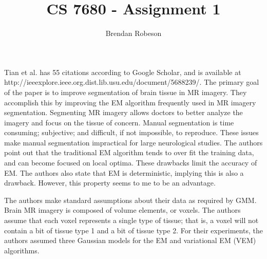 \documentclass[11pt]{article}
\begin{document}
\title{CS 7680 - Assignment 1}
\author{Brendan Robeson}
\maketitle

Tian et al. \cite{5688239} has 55 citations according to Google Scholar, and is
available at \\ http://ieeexplore.ieee.org.dist.lib.usu.edu/document/5688239/.
The primary goal of the paper is to improve segmentation of brain tissue in MR
imagery. They accomplish this by improving the EM algorithm frequently used in
MR imagery segmentation. Segmenting MR imagery allows doctors to better analyze
the imagery and focus on the tissue of concern. Manual segmentation is time
consuming; subjective; and difficult, if not impossible, to reproduce. These
issues make manual segmentation impractical for large neurological studies. The
authors point out that the traditional EM algorithm tends to over fit the
training data, and can become focused on local optima. These drawbacks limit the
accuracy of EM. The authors also state that EM is deterministic, implying this
is also a drawback. However, this property seems to me to be an advantage.

The authors make standard assumptions about their data as required by GMM. Brain
MR imagery is composed of volume elements, or voxels. The authors assume that
each voxel represents a single type of tissue; that is, a voxel will not contain
a bit of tissue type 1 and a bit of tissue type 2. For their experiments, the
authors assumed three Gaussian models for the EM and variational EM (VEM)
algorithms.



\end{document}

